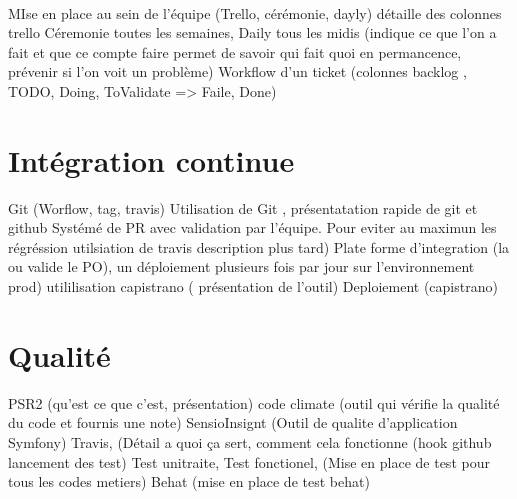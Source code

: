   \paragraph{}
  
MIse en place au sein de l'équipe (Trello, cérémonie, dayly)
détaille des colonnes trello 
Céremonie toutes les semaines,
Daily tous les midis (indique ce que l'on a fait et que ce compte faire permet de savoir qui fait quoi en permancence, 
prévenir si l'on voit un problème)
Workflow d'un ticket (colonnes backlog , TODO, Doing, ToValidate => Faile, Done)
\section{Intégration continue}
Git (Worflow, tag, travis) 
Utilisation de Git , présentatation rapide de git et github
Systémé de PR avec validation par l'équipe. 
Pour eviter au maximun les régréssion utilsiation de travis description plus tard)
Plate forme d'integration (la ou valide le PO), un déploiement plusieurs fois par jour sur l'environnement prod) utililisation capistrano ( présentation de l'outil) 
Deploiement (capistrano)
\section{Qualité}
PSR2 (qu'est ce que c'est, présentation)
code climate (outil qui vérifie la qualité du code et fournis une note) 
SensioInsignt (Outil de qualite d'application Symfony)
Travis, (Détail a quoi ça sert, comment cela fonctionne (hook github lancement des test) 
Test unitraite, Test fonctionel, (Mise en place de test  pour tous les codes metiers) 
Behat (mise en place de test behat) 
